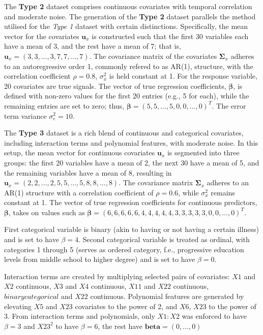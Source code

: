 \documentclass[
  11pt,
]{article}
\begin{document}
\hfill\break

The \textbf{Type 2} dataset comprises continuous covariates with
temporal correlation and moderate noise. The generation of the
\textbf{Type 2} dataset parallels the method utilised for the \emph{Type
1} dataset with certain distinctions. Specifically, the mean vector for
the covariates \(\mathbf{u}_x\) is constructed such that the first 30
variables each have a mean of 3, and the rest have a mean of 7; that is,
\(\mathbf{u}_x = (3, 3, \ldots, 3, 7, 7, \ldots, 7)\). The covariance
matrix of the covariates \(\mathbf{\Sigma}_x\) adheres to an
autoregressive order 1, commonly refered to as AR(1), structure, with
the correlation coefficient \(\rho = 0.8\), \(\sigma_x^2\) is held
constant at 1. For the response variable, 20 covariates are true
signals. The vector of true regression coefficients,
\(\boldsymbol{\beta}\), is defined with non-zero values for the first 20
entries (e.g., 5 for each), while the remaining entries are set to zero;
thus, \(\boldsymbol{\beta} = (5, 5, \ldots, 5, 0, 0, \ldots, 0)^T\). The
error term variance \(\sigma_e^2 = 10\).

\hfill\break

The \textbf{Type 3} dataset is a rich blend of continuous and
categorical covariates, including interaction terms and polynomial
features, with moderate noise. In this setup, the mean vector for
continuous covariates \(\mathbf{u}_x\) is segmented into three groups:
the first 20 variables have a mean of 2, the next 30 have a mean of 5,
and the remaining variables have a mean of 8, resulting in
\(\mathbf{u}_x = (2, 2, \ldots, 2, 5, 5, \ldots, 5, 8, 8, \ldots, 8)\).
The covariance matrix \(\mathbf{\Sigma}_x\) adheres to an AR(1)
structure with a correlation coefficient of \(\rho = 0.6\), while
\(\sigma_x^2\) remains constant at 1. The vector of true regression
coefficients for continuous predictors, \(\boldsymbol{\beta}\), takes on
values such as
\(\boldsymbol{\beta} = (6, 6, 6, 6, 6, 4, 4, 4, 4, 4, 3, 3, 3, 3, 3, 0, 0, \ldots, 0)^T\).

First categorical variable is binary (akin to having or not having a
certain illness) and is set to have \(\beta = 4\). Second categorical
variable is treated as ordinal, with categories 1 through 5 (serves as
ordered category, f.e., progressive education levels from middle school
to higher degree) and is set to have \(\beta = 0\).

Interaction terms are created by multiplying selected pairs of
covariates: \(X1\) and \(X2\) continuous, \(X3\) and \(X4\) continuous,
\(X11\) and \(X22\) continuous, \(binary categorical\) and \(X22\)
continuous. Polynomial features are generated by elevating \(X5\) and
\(X23\) covariates to the power of 2, and \(X6\), \(X23\) to the power
of 3. From interaction terms and polynomials, only \(X1 : X2\) was
enforced to have \(\beta = 3\) and \(X23^2\) to have \(\beta = 6\), the
rest have \(\boldsymbol{beta} = (0, \ldots, 0)\)
\end{document}
